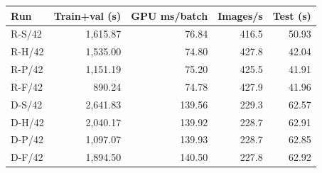 \begin{tabular}{lrrrr}
\toprule
Run & Train+val (s) & GPU ms/batch & Images/s & Test (s)\\
\midrule
R-S/42 & 1,615.87 & 76.84 & 416.5 & 50.93\\
R-H/42 & 1,535.00 & 74.80 & 427.8 & 42.04\\
R-P/42 & 1,151.19 & 75.20 & 425.5 & 41.91\\
R-F/42 & 890.24 & 74.78 & 427.9 & 41.96\\
D-S/42 & 2,641.83 & 139.56 & 229.3 & 62.57\\
D-H/42 & 2,040.17 & 139.92 & 228.7 & 62.91\\
D-P/42 & 1,097.07 & 139.93 & 228.7 & 62.85\\
D-F/42 & 1,894.50 & 140.50 & 227.8 & 62.92\\
\bottomrule
\end{tabular}
